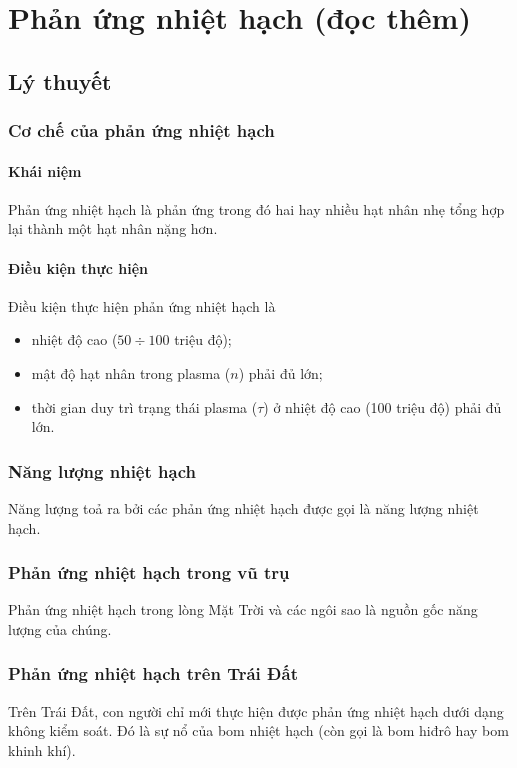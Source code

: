 
\chapter[Phản ứng nhiệt hạch (đọc thêm)]{Phản ứng nhiệt hạch (đọc thêm)}
\section{Lý thuyết}
\subsection{Cơ chế của phản ứng nhiệt hạch}
\subsubsection{Khái niệm}
Phản ứng nhiệt hạch là phản ứng trong đó hai hay nhiều hạt nhân nhẹ tổng hợp lại thành một hạt nhân nặng hơn.
\subsubsection{Điều kiện thực hiện}
Điều kiện thực hiện phản ứng nhiệt hạch là
\begin{itemize}
	\item nhiệt độ cao ($50\div100$ triệu độ);
	\item mật độ hạt nhân trong plasma ($n$) phải đủ lớn;
	\item thời gian duy trì trạng thái plasma ($\tau$) ở nhiệt độ cao (100 triệu độ) phải đủ lớn.
\end{itemize}
\subsection{Năng lượng nhiệt hạch}
Năng lượng toả ra bởi các phản ứng nhiệt hạch được gọi là năng lượng
nhiệt hạch.
\subsection{Phản ứng nhiệt hạch trong vũ trụ}
Phản ứng nhiệt hạch trong lòng Mặt Trời và các ngôi sao là nguồn gốc năng lượng của chúng.
\subsection{Phản ứng nhiệt hạch trên Trái Đất}
Trên Trái Đất, con người chỉ mới thực hiện được phản ứng nhiệt hạch dưới dạng không kiểm soát. Đó là sự nổ của bom nhiệt hạch (còn gọi là bom hiđrô hay bom khinh khí).